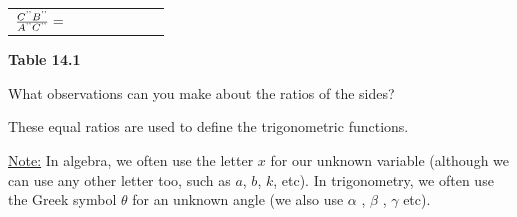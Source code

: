 {\begin{center}
\begin{xtabular*}{\mytablewidth}[t]{|p{10\mystarwidth}|p{10\mystarwidth}|p{10\mystarwidth}|}
    
        
                \begin{math}\frac{{C}^{\text{'}\text{'}}{B}^{\text{'}\text{'}}}{{A}^{\text{'}\text{'}}{C}^{\text{'}\text{'}}}=\phantom{\rule{42.67912pt}{0ex}}\end{math}
     \tabularnewline{}
    \end{xtabular*}
      \end{center}
    \begin{center}{\small\bfseries Table 14.1}\end{center}
    
    \addtocounter{footnote}{-0}
    
        }%
      
    \par
  
      \label{m39405*id79075}What observations can you make about the ratios of the sides?\par 
      \label{m39405*id79081}These equal ratios are used to define the trigonometric functions.\par 
      \label{m39405*id79087}\uline{Note:} In algebra, we often use the letter \begin{math}x\end{math} for our unknown variable (although we can use any other letter too, such as \begin{math}a\end{math}, \begin{math}b\end{math}, \begin{math}k\end{math}, etc). In trigonometry, we often use the Greek symbol \begin{math}\theta \end{math} for an unknown angle (we also use \begin{math}\alpha \end{math} , \begin{math}\beta \end{math} , \begin{math}\gamma \end{math} etc). \par 

